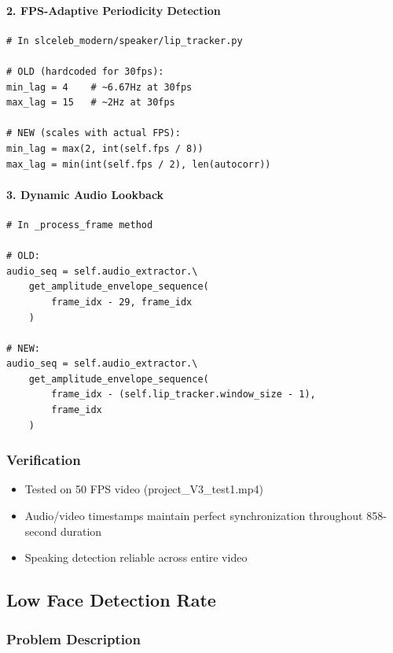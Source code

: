 \documentclass[11pt,a4paper]{article}
\begin{document}
\paragraph{2. FPS-Adaptive Periodicity Detection}
\begin{lstlisting}[style=pythoncode]
# In slceleb_modern/speaker/lip_tracker.py

# OLD (hardcoded for 30fps):
min_lag = 4    # ~6.67Hz at 30fps
max_lag = 15   # ~2Hz at 30fps

# NEW (scales with actual FPS):
min_lag = max(2, int(self.fps / 8))
max_lag = min(int(self.fps / 2), len(autocorr))
\end{lstlisting}

\paragraph{3. Dynamic Audio Lookback}
\begin{lstlisting}[style=pythoncode]
# In _process_frame method

# OLD:
audio_seq = self.audio_extractor.\
    get_amplitude_envelope_sequence(
        frame_idx - 29, frame_idx
    )

# NEW:
audio_seq = self.audio_extractor.\
    get_amplitude_envelope_sequence(
        frame_idx - (self.lip_tracker.window_size - 1), 
        frame_idx
    )
\end{lstlisting}

\subsubsection{Verification}

\begin{itemize}
    \item Tested on 50 FPS video (project\_V3\_test1.mp4)
    \item Audio/video timestamps maintain perfect synchronization throughout 858-second duration
    \item Speaking detection reliable across entire video
\end{itemize}

\subsection{Low Face Detection Rate}

\subsubsection{Problem Description}
\end{document}
